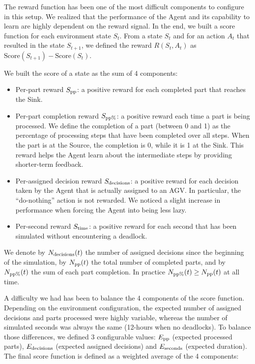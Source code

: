 \documentclass[sn-mathphys]{sn-jnl}
\begin{document}
The reward function has been one of the most difficult components to configure in this setup. We realized that the performance of the Agent and its capability to learn are highly dependent on the reward signal. In the end, we built a score function for each environment state $S_t$. From a state $S_t$ and for an action $A_t$ that resulted in the state $S_{t+1}$, we defined the reward $R(S_t, A_t)$ as $\text{Score}(S_{t+1}) - \text{Score}(S_t)$.

We built the score of a state as the sum of 4 components:
\begin{itemize}
    \item Per-part reward $S_{\rm pp}$: a positive reward for each completed part that reaches the Sink.
    \item Per-part completion reward $S_{\rm pp\%}$: a positive reward each time a part is being processed. We define the completion of a part (between 0 and 1) as the percentage of processing steps that have been completed over all steps. When the part is at the Source, the completion is 0, while it is 1 at the Sink. This reward helps the Agent learn about the intermediate steps by providing shorter-term feedback.
    \item Per-assigned decision reward $S_{\rm decisions}$: a positive reward for each decision taken by the Agent that is actually assigned to an AGV. In particular, the “do-nothing” action is not rewarded. We noticed a slight increase in performance when forcing the Agent into being less lazy.
    \item Per-second reward $S_{\rm time}$: a positive reward for each second that has been simulated without encountering a deadlock. 
\end{itemize}

We denote by $N_{\rm decisions}(t)$ the number of assigned decisions since the beginning of the simulation, by $N_{\rm pp}(t)$ the total number of completed parts, and by $N_{\rm pp\%}(t)$ the sum of each part completion. In practice $N_{\rm pp\%}(t) \ge N_{\rm pp}(t)$ at all time.

A difficulty we had has been to balance the 4 components of the score function. Depending on the environment configuration, the expected number of assigned decisions and parts processed were highly variable, whereas the number of simulated seconds was always the same (12-hours when no deadlocks). To balance those differences, we defined 3 configurable values: $E_{\rm pp}$ (expected processed parts), $E_{\rm decisions}$ (expected assigned decisions) and $E_{\rm seconds}$ (expected duration). The final score function is defined as a weighted average of the 4 components:
\end{document}
